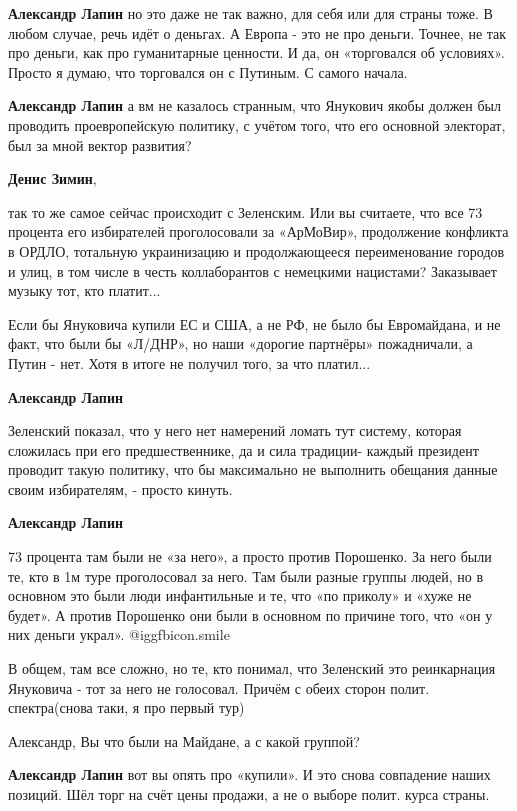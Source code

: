 \begin{itemize}
\begin{itemize}
\textbf{Александр Лапин} но это даже не так важно, для себя или для страны тоже. В любом случае, речь идёт о деньгах. А Европа - это не про деньги. Точнее, не так про деньги, как про гуманитарные ценности.
И да, он «торговался об условиях». Просто я думаю, что торговался он с Путиным. С самого начала.

\textbf{Александр Лапин} а вм не казалось странным, что Янукович якобы должен был проводить проевропейскую политику, с учётом того, что его основной электорат, был за мной вектор развития?

\textbf{Денис Зимин}, 

так то же самое сейчас происходит с Зеленским. Или вы считаете, что все 73
процента его избирателей проголосовали за «АрМоВир», продолжение конфликта в
ОРДЛО, тотальную украинизацию и продолжающееся переименование городов и улиц, в
том числе в честь коллаборантов с немецкими нацистами? Заказывает музыку тот,
кто платит...


Если бы Януковича купили ЕС и США, а не РФ, не было бы Евромайдана, и не факт,
что были бы «Л/ДНР», но наши «дорогие партнёры» пожадничали, а Путин - нет.
Хотя в итоге не получил того, за что платил...


\textbf{Александр Лапин} 

Зеленский показал, что у него нет намерений ломать тут систему, которая
сложилась при его предшественнике, да и сила традиции- каждый президент
проводит такую политику, что бы максимально не выполнить обещания данные своим
избирателям, - просто кинуть.

\textbf{Александр Лапин} 

73 процента там были не «за него», а просто против Порошенко. За него были те,
кто в 1м туре проголосовал за него. Там были разные группы людей, но в основном
это были люди инфантильные и те, что «по приколу» и «хуже не будет». А против
Порошенко они были в основном по причине того, что «он у них деньги украл».
@igg{fbicon.smile} 

В общем, там все сложно, но те, кто понимал, что Зеленский это реинкарнация
Януковича - тот за него не голосовал. Причём с обеих сторон полит.
спектра(снова таки, я про первый тур)

Александр, Вы что были на Майдане, а с какой группой?

\textbf{Александр Лапин} вот вы опять про «купили». И это снова совпадение наших позиций. Шёл торг на счёт цены продажи, а не о выборе полит. курса страны.


\end{itemize}
\end{itemize}
